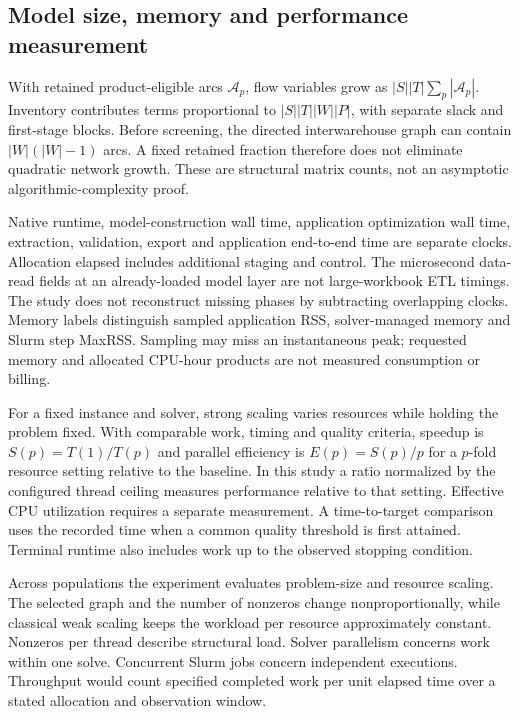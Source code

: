 \documentclass[
  english,
  11pt,
  a4paper,
  authoryear,
  preprint]{elsarticle}
\begin{document}
\subsection{Model size, memory and performance
measurement}\label{model-size-memory-and-performance-measurement}

With retained product-eligible arcs \(\mathcal A_p\), flow variables
grow as \(|S||T|\sum_p|\mathcal A_p|\). Inventory contributes terms
proportional to \(|S||T||W||P|\), with separate slack and first-stage
blocks. Before screening, the directed interwarehouse graph can contain
\(|W|(|W|-1)\) arcs. A fixed retained fraction therefore does not
eliminate quadratic network growth. These are structural matrix counts,
not an asymptotic algorithmic-complexity proof.

Native runtime, model-construction wall time, application optimization
wall time, extraction, validation, export and application end-to-end
time are separate clocks. Allocation elapsed includes additional staging
and control. The microsecond data-read fields at an already-loaded model
layer are not large-workbook ETL timings. The study does not reconstruct missing
phases by subtracting overlapping clocks. Memory labels distinguish
sampled application RSS, solver-managed memory and Slurm step MaxRSS.
Sampling may miss an instantaneous peak; requested memory and allocated
CPU-hour products are not measured consumption or billing.

For a fixed instance and solver, strong scaling varies resources while
holding the problem fixed. With comparable work, timing and quality
criteria, speedup is \(S(p)=T(1)/T(p)\) and parallel efficiency is
\(E(p)=S(p)/p\) for a \(p\)-fold resource setting relative to the
baseline. In this study a ratio normalized by the configured thread
ceiling measures performance relative to that setting. Effective CPU
utilization requires a separate measurement. A time-to-target comparison
uses the recorded time when a common quality threshold is first
attained. Terminal runtime also includes work up to the observed
stopping condition.

Across populations the experiment evaluates problem-size and resource
scaling. The selected graph and the number of nonzeros change
nonproportionally, while classical weak scaling keeps the workload per
resource approximately constant. Nonzeros per thread describe structural
load. Solver parallelism concerns work within one solve. Concurrent
Slurm jobs concern independent executions. Throughput would count
specified completed work per unit elapsed time over a stated allocation
and observation window.
\end{document}
